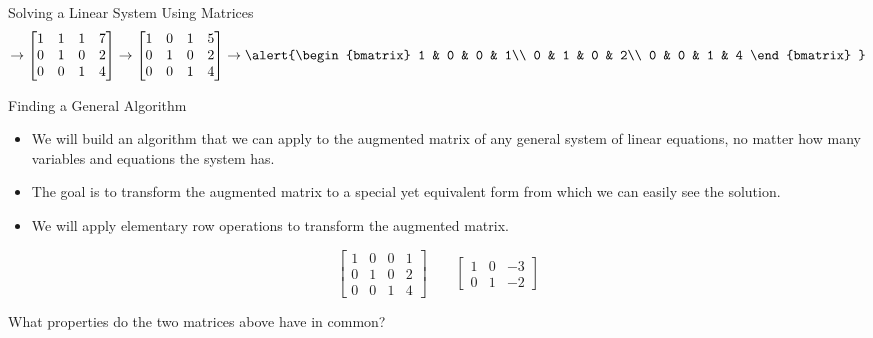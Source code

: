 \documentclass[xcolor=dvipsnames,aspectratio=169,t]{beamer}
\begin{document}
\begin{frame}{Solving a Linear System Using Matrices}
  {\small
    \[ \rightarrow
  \begin{bmatrix}
        1 & 1 & 1 & 7\\
        0 & 1 & 0 & 2\\
        0 & 0 & 1 & 4
      \end{bmatrix}  
  \rightarrow
  \begin{bmatrix}
        1 & 0 & 1 & 5\\
        0 & 1 & 0 & 2\\
        0 & 0 & 1 & 4
      \end{bmatrix}  
  \rightarrow
  \alert{\begin{bmatrix}
        1 & 0 & 0 & 1\\
        0 & 1 & 0 & 2\\
        0 & 0 & 1 & 4
      \end{bmatrix}  }
  \]}
    
  
\end{frame}


\begin{frame}{Finding a General Algorithm}
  \begin{itemize}
    \item We will build an algorithm that we can apply to the augmented matrix of any general system of linear equations, no matter how many  variables and equations the system has.
    \item The goal is to transform the augmented matrix to a special yet \alert{equivalent} form from which we can easily see the solution.
    \item We will apply \alert{elementary row operations} to transform the augmented matrix.
  \end{itemize}

  \[ 
  \begin{bmatrix}
    1 & 0 & 0 & 1\\
    0 & 1 & 0 & 2\\
    0 & 0 & 1 & 4
  \end{bmatrix}       \qquad  
  \begin{bmatrix}
    1 & 0 & -3 \\
    0 & 1 & -2
  \end{bmatrix}
  \]
  \medskip

  \bbox
    What properties do the two matrices above have in common?
  \ebox
\end{frame}
\end{document}
